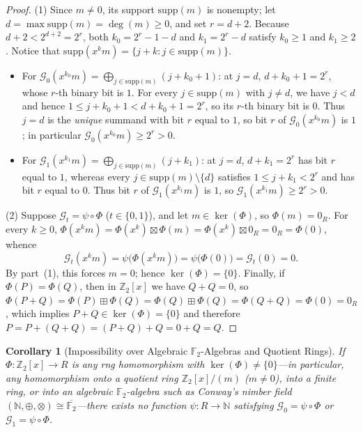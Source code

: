 \documentclass[11pt,a4paper]{article}
\newtheorem{corollary}[theorem]{Corollary}
\theoremstyle{definition}
\newcommand{\F}{\mathbb{F}}
\newcommand{\Z}{\mathbb{Z}}
\newcommand{\N}{\mathbb{N}}
\newcommand{\SG}{\mathcal{G}}
\newcommand{\supp}{\mathrm{supp}}
\begin{document}
\begin{proof}
(1) Since $m \neq 0$, its support $\supp(m)$ is nonempty; let $d = \max\supp(m) = \deg(m) \ge 0$,
and set $r = d + 2$. Because $d + 2 < 2^{d+2} = 2^r$, both $k_0 = 2^r - 1 - d$ and
$k_1 = 2^r - d$ satisfy $k_0 \ge 1$ and $k_1 \ge 2$. Notice that
$\supp(x^k m) = \{j + k : j \in \supp(m)\}$.
\begin{itemize}
  \setlength{\itemsep}{2pt}
  \item For $\SG_0(x^{k_0} m) = \bigoplus_{j\in\supp(m)} (j + k_0 + 1)$: at $j = d$,
    $d + k_0 + 1 = 2^r$, whose $r$-th binary bit is $1$. For every $j \in \supp(m)$ with
    $j \neq d$, we have $j < d$ and hence $1 \le j + k_0 + 1 < d + k_0 + 1 = 2^r$, so its
    $r$-th binary bit is $0$. Thus $j = d$ is the \emph{unique} summand with bit $r$ equal
    to $1$, so bit $r$ of $\SG_0(x^{k_0} m)$ is $1$; in particular
    $\SG_0(x^{k_0} m) \ge 2^r > 0$.
  \item For $\SG_1(x^{k_1} m) = \bigoplus_{j\in\supp(m)} (j + k_1)$: at $j = d$,
    $d + k_1 = 2^r$ has bit $r$ equal to $1$, whereas every $j \in \supp(m)\setminus\{d\}$
    satisfies $1 \le j + k_1 < 2^r$ and has bit $r$ equal to $0$. Thus bit $r$ of
    $\SG_1(x^{k_1} m)$ is $1$, so $\SG_1(x^{k_1} m) \ge 2^r > 0$.
\end{itemize}

\smallskip
\noindent(2) Suppose $\SG_t = \psi \circ \Phi$ ($t \in \{0,1\}$), and let $m \in \ker(\Phi)$,
so $\Phi(m) = 0_R$. For every $k \ge 0$,
$\Phi(x^k m) = \Phi(x^k) \boxtimes \Phi(m) = \Phi(x^k) \boxtimes 0_R = 0_R = \Phi(0)$,
whence
\[
  \SG_t(x^k m) = \psi\bigl(\Phi(x^k m)\bigr) = \psi\bigl(\Phi(0)\bigr) = \SG_t(0) = 0.
\]
By part~(1), this forces $m = 0$; hence $\ker(\Phi) = \{0\}$. Finally, if
$\Phi(P) = \Phi(Q)$, then in $\Z_2[x]$ we have $Q + Q = 0$, so
$\Phi(P + Q) = \Phi(P) \boxplus \Phi(Q) = \Phi(Q) \boxplus \Phi(Q) = \Phi(Q + Q)
= \Phi(0) = 0_R$, which implies $P + Q \in \ker(\Phi) = \{0\}$ and therefore
$P = P + (Q + Q) = (P + Q) + Q = 0 + Q = Q$.
\end{proof}

\begin{corollary}[Impossibility over Algebraic $\F_2$-Algebras and Quotient Rings]
\label{cor:algebraic}
If $\Phi : \Z_2[x] \to R$ is any rng homomorphism with $\ker(\Phi) \neq \{0\}$---in
particular, any homomorphism onto a quotient ring $\Z_2[x]/(m)$ ($m \neq 0$), into a finite
ring, or into an algebraic $\F_2$-algebra such as Conway's nimber field
$(\N,\oplus,\otimes) \cong \overline{\F_2}$---there exists \emph{no} function
$\psi : R \to \N$ satisfying $\SG_0 = \psi \circ \Phi$ or $\SG_1 = \psi \circ \Phi$.
\end{corollary}
\end{document}
